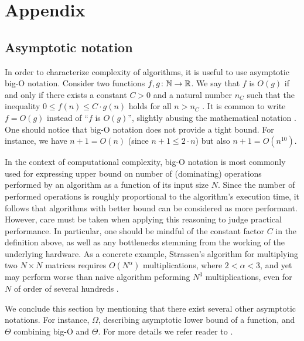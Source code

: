 \chapter{Appendix}


\section{Asymptotic notation}

In order to characterize complexity of algorithms, it is useful to use asymptotic big-O notation. Consider two functions $f, g \colon \mathbb{N} \to \mathbb{R}$. We say that $f$ is $O(g)$ if and only if there exists a constant $C > 0$ and a natural number $n_{C}$ such that the inequality $0 \le f(n) \le C\cdot g(n)$ holds for all $n > n_{C}$ \cite{clrs}. It is common to write $f=O(g)$ instead of ``$f$ is $O(g)$'', slightly abusing the mathematical notation \cite{clrs}. One should notice that big-O notation does not provide a tight bound. For instance, we have $n + 1 = O(n)$ (since $n + 1 \le 2 \cdot n$) but also $n+1 = O(n^{10})$.

In the context of computational complexity, big-O notation is most commonly used for expressing upper bound on number of (dominating) operations performed by an algorithm as a function of its input size $N$. Since the number of performed operations is roughly proportional to the algorithm's execution time, it follows that algorithms with better bound can be considered as more performant. However, care must be taken when applying this reasoning to judge practical performance. In particular, one should be mindful of the constant factor $C$ in the definition above, as well as any bottlenecks stemming from the working of the underlying hardware. As a concrete example, Strassen's algorithm for multiplying two $N \times N$ matrices requires $O(N^{\alpha})$ multiplications, where $2 < \alpha < 3$, and yet may perform  worse than naive algorithm peforming $N^{3}$ multiplications, even for $N$ of order of several hundreds \cite{dalberto}.

We conclude this section by mentioning that there exist several other asymptotic notations. For instance, $\Omega$, describing asymptotic lower bound of a function, and $\Theta$ combining big-O and $\Theta$. For more details we refer reader to \cite{clrs}.

